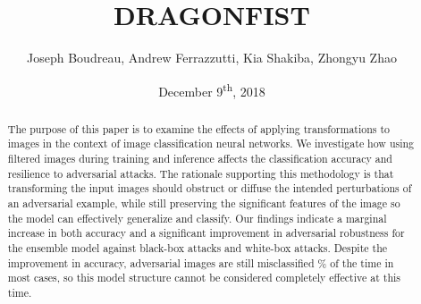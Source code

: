 \documentclass[11pt,twocolumn]{IEEEtran}
\title{DRAGONFIST}
\author{Joseph Boudreau, Andrew Ferrazzutti, Kia Shakiba, Zhongyu Zhao}
\date{December 9\textsuperscript{th}, 2018}
\begin{document}
	\maketitle

	\begin{abstract}
		The purpose of this paper is to examine the effects of applying transformations to images in the context of image classification neural networks.
		We investigate how using filtered images during training and inference affects the classification accuracy and resilience to adversarial attacks.
		The rationale supporting this methodology is that transforming the input images should obstruct or diffuse the intended perturbations of an adversarial example, while still preserving the significant features of the image so the model can effectively generalize and classify.
		Our findings indicate a marginal increase in both accuracy and a significant improvement in adversarial robustness for the ensemble model against black-box attacks and white-box attacks.
		Despite the improvement in accuracy, adversarial images are still misclassified \% of the time in most cases, so this model structure cannot be considered completely effective at this time.
	\end{abstract}

	
	
    
	
	
	
	


	
	{}
\end{document}
